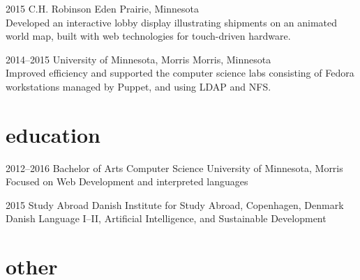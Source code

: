 \documentclass[]{cv-style} %
\begin{document}
\begin{entrylist}

\entry
{2015}
{C.H. Robinson}
{Eden Prairie, Minnesota}
{ \\
Developed an interactive lobby display illustrating shipments on an animated world map, built with web technologies for touch-driven hardware.}


\entry
{2014--2015}
{University of Minnesota, Morris}
{Morris, Minnesota}
{ \\
Improved efficiency and supported the computer science labs consisting of Fedora workstations managed by Puppet, and using LDAP and NFS.}


\end{entrylist}


\section{education}

\begin{entrylist}


\entry
{2012--2016}
{Bachelor of Arts {\normalfont Computer Science}}
{University of Minnesota, Morris}
{\small{Focused on Web Development and interpreted languages}}

\entry
{2015}
{Study Abroad}
{Danish Institute for Study Abroad, Copenhagen, Denmark}
{\small{Danish Language I--II, Artificial Intelligence, and Sustainable Development}}


\end{entrylist}


\section{other}
\end{document}
